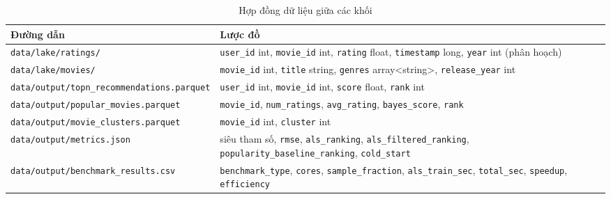 \begin{table}[H]
\centering
\caption{Hợp đồng dữ liệu giữa các khối}
\label{tab:contract}
\small
\begin{tabularx}{\textwidth}{l X}
\toprule
\textbf{Đường dẫn} & \textbf{Lược đồ} \\
\midrule
\texttt{data/lake/ratings/} & \texttt{user\_id} int, \texttt{movie\_id} int, \texttt{rating} float, \texttt{timestamp} long, \texttt{year} int (phân hoạch) \\
\texttt{data/lake/movies/} & \texttt{movie\_id} int, \texttt{title} string, \texttt{genres} array<string>, \texttt{release\_year} int \\
\texttt{data/output/topn\_recommendations.parquet} & \texttt{user\_id} int, \texttt{movie\_id} int, \texttt{score} float, \texttt{rank} int \\
\texttt{data/output/popular\_movies.parquet} & \texttt{movie\_id}, \texttt{num\_ratings}, \texttt{avg\_rating}, \texttt{bayes\_score}, \texttt{rank} \\
\texttt{data/output/movie\_clusters.parquet} & \texttt{movie\_id} int, \texttt{cluster} int \\
\texttt{data/output/metrics.json} & siêu tham số, \texttt{rmse}, \texttt{als\_ranking}, \texttt{als\_filtered\_ranking}, \texttt{popularity\_baseline\_ranking}, \texttt{cold\_start} \\
\texttt{data/output/benchmark\_results.csv} & \texttt{benchmark\_type}, \texttt{cores}, \texttt{sample\_fraction}, \texttt{als\_train\_sec}, \texttt{total\_sec}, \texttt{speedup}, \texttt{efficiency} \\
\bottomrule
\end{tabularx}
\end{table}

